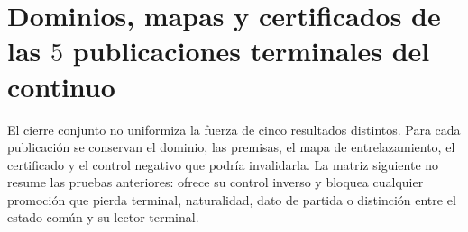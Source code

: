 \chapter{Dominios, mapas y certificados de las \(5\) publicaciones terminales del continuo}
\label{chap:hmt83-falsadores-clausuras}

El cierre conjunto no uniformiza la fuerza de cinco resultados distintos. Para
cada publicación se conservan el dominio, las premisas, el mapa de
entrelazamiento, el certificado y el control negativo que podría invalidarla.
La matriz siguiente no resume las pruebas anteriores: ofrece su control inverso
y bloquea cualquier promoción que pierda terminal, naturalidad, dato de partida
o distinción entre el estado común y su lector terminal.


